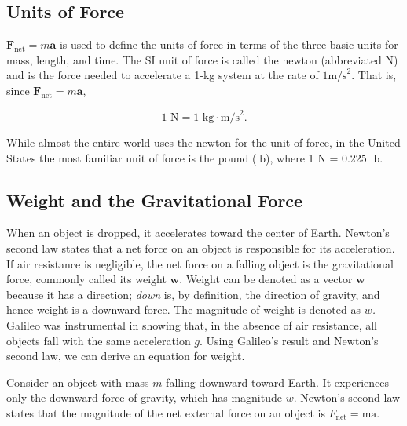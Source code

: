 \documentclass[
]{book}
\begin{document}
\hypertarget{import-auto-id1422615}{}
\hypertarget{units-of-force}{%
\subsection{Units of Force}\label{units-of-force}}

\({\textbf{F}_{\text{net}} = m\textbf{a}}{}\) is used to define the units
of force in terms of the three basic units for mass, length, and time.
The SI unit of force is called the \protect\hypertarget{import-auto-id2929123}{}{newton} (abbreviated N) and is the force needed to accelerate
a 1-kg system at the rate of \({1\text{m/s}^{2}}{}\). That is, since
\({\textbf{F}_{\text{net}} = m\textbf{a}}{}\),

\leavevmode{}%
\[{\text{1\ N} = {\text{1\ kg} \cdot \text{m/s}^{2}}}.\]

While almost the entire world uses the newton for the unit of force, in
the United States the most familiar unit of force is the pound (lb),
where 1 N = 0.225 lb.

\hypertarget{import-auto-id1404093}{}
\hypertarget{weight-and-the-gravitational-force}{%
\subsection{Weight and the Gravitational Force}\label{weight-and-the-gravitational-force}}

When an object is dropped, it accelerates toward the center of Earth.
Newton's second law states that a net force on an object is responsible
for its acceleration. If air resistance is negligible, the net force on
a falling object is the gravitational force, commonly called its
\protect\hypertarget{import-auto-id3064229}{}{weight} \(\textbf{w}{}\). Weight
can be denoted as a vector \(\textbf{w}{}\) because it has a direction;
\emph{down} is, by definition, the direction of gravity, and hence weight is
a downward force. The magnitude of weight is denoted as \(w{}\)\emph{.} Galileo
was instrumental in showing that, in the absence of air resistance, all
objects fall with the same acceleration \(g{}\). Using Galileo's result
and Newton's second law, we can derive an equation for weight.

Consider an object with mass \(m{}\) falling downward toward Earth. It
experiences only the downward force of gravity, which has magnitude
\(w{}\). Newton's second law states that the magnitude of the net external
force on an object is \({F_{\text{net}} = \text{ma}}{}\).
\end{document}
